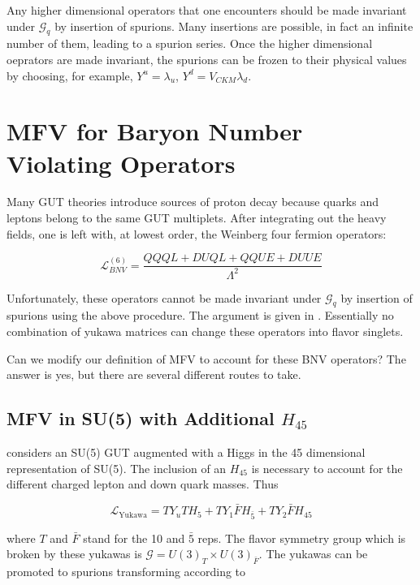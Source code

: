 \documentclass[aps,onecolumn,twoside,secnumarabic,balancelastpage,amsmath,amssymb,nofootinbib,hyperref=pdftex]{revtex4}
\begin{document}
Any higher dimensional operators that one encounters should be made invariant under $\mathcal{G}_q$ by insertion of spurions. Many insertions are possible, in fact an infinite number of them, leading to a spurion series. Once the higher dimensional oeprators are made invariant, the spurions can be frozen to their physical values by choosing, for example, $Y^{u} = \lambda_{u}$, $Y^{d} = V_{CKM}\lambda_{d}$. 

\section{MFV for Baryon Number Violating Operators}

Many GUT theories introduce sources of proton decay because quarks and leptons belong to the same GUT multiplets. After integrating out the heavy fields, one is left with, at lowest order, the Weinberg four fermion operators:

\begin{equation}
\mathcal{L}^{(6)}_{BNV} = \frac{QQQL + DUQL + QQUE + DUUE}{\Lambda^2}
\end{equation}

Unfortunately, these operators cannot be made invariant under $\mathcal{G}_q$ by insertion of spurions using the above procedure. The argument is given in \cite{Alonso}. Essentially no combination of yukawa matrices can change these operators into flavor singlets. 

Can we modify our definition of MFV to account for these BNV operators? The answer is yes, but there are several different routes to take. 

\subsection{MFV in SU(5) with Additional $H_{45}$}
\cite{Barbieri} considers an SU(5) GUT augmented with a Higgs in the 45 dimensional representation of SU(5). The inclusion of an $H_{45}$ is necessary to account for the different charged lepton and down quark masses. Thus

\begin{equation}
\mathcal{L}_{\text{Yukawa}} = TY_{u}TH_{5} + TY_{1}\bar{F}H_{\bar{5}} + TY_{2}\bar{F}H_{45}
\end{equation}

where $T$ and $\bar{F}$ stand for the 10 and $\bar{5}$ reps. The flavor symmetry group which is broken by these yukawas is $\mathcal{G} = U(3)_{T} \times U(3)_{\bar{F}}$. The yukawas can be promoted to spurions transforming according to
\end{document}
